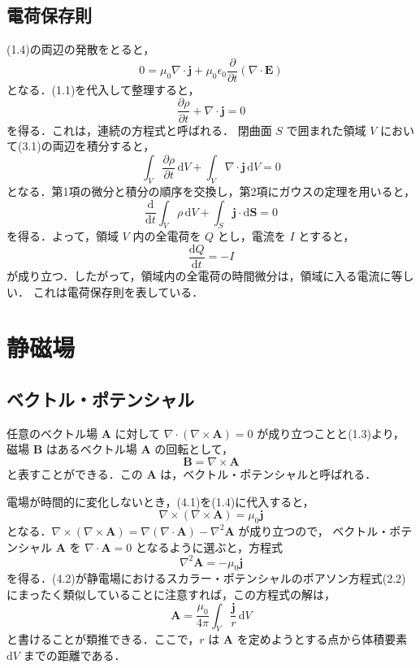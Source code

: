 \documentclass[11pt, a4paper]{ltjsarticle}
\numberwithin{equation}{section}
\begin{document}
\subsection{電荷保存則}
(1.4)の両辺の発散をとると，
\[
  0 = \mu_0 \nabla \cdot \bm{j} + \mu_0 \epsilon_0 \frac{\partial}{\partial t} \left( \nabla \cdot \bm{E} \right)
\]
となる．(1.1)を代入して整理すると，
\begin{equation}
  \frac{\partial \rho}{\partial t} + \nabla \cdot \bm{j} = 0
\end{equation}
を得る．これは，連続の方程式と呼ばれる．
閉曲面 $S$ で囲まれた領域 $V$ において(3.1)の両辺を積分すると， 
\[
  \int_V \frac{\partial \rho}{\partial t} \, \mathrm{d}V + \int_V \nabla \cdot \bm{j} \, \mathrm{d}V = 0
\]
となる．第1項の微分と積分の順序を交換し，第2項にガウスの定理を用いると，
\[
  \frac{\mathrm{d}}{\mathrm{d} t} \int_V \rho \, \mathrm{d}V + \int_S \bm{j} \cdot \mathrm{d}\bm{S} = 0
\]
を得る．よって，領域 $V$ 内の全電荷を $Q$ とし，電流を $I$ とすると，
\begin{equation}
  \frac{\mathrm{d} Q}{\mathrm{d} t} = - I
\end{equation}
が成り立つ．したがって，領域内の全電荷の時間微分は，領域に入る電流に等しい．
これは電荷保存則を表している．

\section{静磁場}
\subsection{ベクトル・ポテンシャル}
任意のベクトル場 $\bm{A}$ に対して $\nabla \cdot \left( \nabla \times \bm{A} \right) = 0$ が成り立つことと(1.3)より，
磁場 $\bm{B}$ はあるベクトル場 $\bm{A}$ の回転として，
\begin{equation}
  \bm{B} = \nabla \times \bm{A}
\end{equation}
と表すことができる．この $\bm{A}$ は，ベクトル・ポテンシャルと呼ばれる．

電場が時間的に変化しないとき，(4.1)を(1.4)に代入すると，
\[
  \nabla \times \left( \nabla \times \bm{A} \right) = \mu_0 \bm{j}
\]
となる．$\nabla \times \left( \nabla \times \bm{A} \right) = \nabla \left( \nabla \cdot \bm{A} \right) - \nabla^{2} \bm{A}$ が成り立つので，
ベクトル・ポテンシャル $\bm{A}$ を $\nabla \cdot \bm{A} = 0$ となるように選ぶと，方程式
\begin{equation}
  \nabla^{2} \bm{A} = - \mu_0 \bm{j}
\end{equation}
を得る．(4.2)が静電場におけるスカラー・ポテンシャルのポアソン方程式(2.2)にまったく類似していることに注意すれば，この方程式の解は，
\begin{equation}
  \bm{A} = \frac{\mu_0}{4 \pi} \int_V \frac{\bm{j}}{r} \, \mathrm{d}{V}
\end{equation}
と書けることが類推できる．ここで，$r$ は $\bm{A}$ を定めようとする点から体積要素 $\mathrm{d}{V}$ までの距離である．
\end{document}
